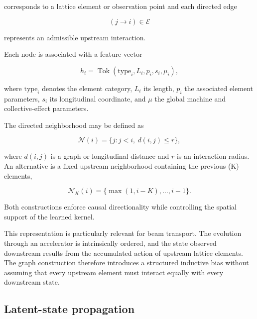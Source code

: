 corresponds to a lattice element or observation point and each directed edge

\begin{equation}
\label{eq:115}
(j\to i)\in\mathcal E
\end{equation}

represents an admissible upstream interaction.

Each node is associated with a feature vector

\begin{equation}
\label{eq:116}
h_i=\operatorname{Tok}(\mathrm{type}_i,L_i,p_i,s_i,\mu_i),
\end{equation}

where \(\mathrm{type}_{i}\) denotes the element category, \(L_{i}\) its length, \(p_{i}\) the associated element parameters, \(s_{i}\) its longitudinal coordinate, and \(\mu\) the global machine and collective-effect parameters.

The directed neighborhood may be defined as

\begin{equation}
\label{eq:117}
\mathcal N(i)=\{j:j<i,\ d(i,j)\le r\},
\end{equation}

where \(d ( i , j )\) is a graph or longitudinal distance and \(r\) is an interaction radius. An alternative is a fixed upstream neighborhood containing the previous (K) elements,

\begin{equation}
\label{eq:118}
\mathcal N_K(i)=\{\max(1,i-K),\ldots,i-1\}.
\end{equation}

Both constructions enforce causal directionality while controlling the spatial support of the learned kernel.

This representation is particularly relevant for beam transport. The evolution through an accelerator is intrinsically ordered, and the state observed downstream results from the accumulated action of upstream lattice elements. The graph construction therefore introduces a structured inductive bias without assuming that every upstream element must interact equally with every downstream state.

\subsection{Latent-state propagation}
\label{sec:04_machine_learning_methodology_latent_state_propagation}


